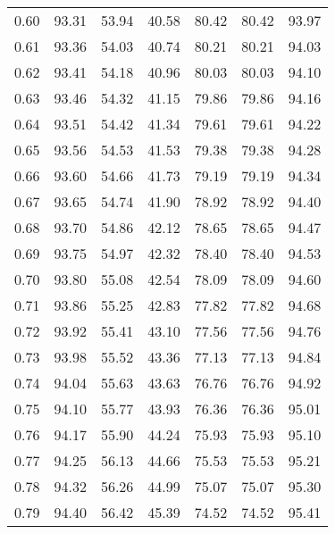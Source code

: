 \begin{tabular}{|c|c|c|c|c|c|c|}
      0.60 &     93.31 &     53.94 &      40.58 &   80.42 &      80.42 &         93.97 \\
      0.61 &     93.36 &     54.03 &      40.74 &   80.21 &      80.21 &         94.03 \\
      0.62 &     93.41 &     54.18 &      40.96 &   80.03 &      80.03 &         94.10 \\
      0.63 &     93.46 &     54.32 &      41.15 &   79.86 &      79.86 &         94.16 \\
      0.64 &     93.51 &     54.42 &      41.34 &   79.61 &      79.61 &         94.22 \\
      0.65 &     93.56 &     54.53 &      41.53 &   79.38 &      79.38 &         94.28 \\
      0.66 &     93.60 &     54.66 &      41.73 &   79.19 &      79.19 &         94.34 \\
      0.67 &     93.65 &     54.74 &      41.90 &   78.92 &      78.92 &         94.40 \\
      0.68 &     93.70 &     54.86 &      42.12 &   78.65 &      78.65 &         94.47 \\
      0.69 &     93.75 &     54.97 &      42.32 &   78.40 &      78.40 &         94.53 \\
      0.70 &     93.80 &     55.08 &      42.54 &   78.09 &      78.09 &         94.60 \\
      0.71 &     93.86 &     55.25 &      42.83 &   77.82 &      77.82 &         94.68 \\
      0.72 &     93.92 &     55.41 &      43.10 &   77.56 &      77.56 &         94.76 \\
      0.73 &     93.98 &     55.52 &      43.36 &   77.13 &      77.13 &         94.84 \\
      0.74 &     94.04 &     55.63 &      43.63 &   76.76 &      76.76 &         94.92 \\
      0.75 &     94.10 &     55.77 &      43.93 &   76.36 &      76.36 &         95.01 \\
      0.76 &     94.17 &     55.90 &      44.24 &   75.93 &      75.93 &         95.10 \\
      0.77 &     94.25 &     56.13 &      44.66 &   75.53 &      75.53 &         95.21 \\
      0.78 &     94.32 &     56.26 &      44.99 &   75.07 &      75.07 &         95.30 \\
      0.79 &     94.40 &     56.42 &      45.39 &   74.52 &      74.52 &         95.41 \\

\end{tabular}

